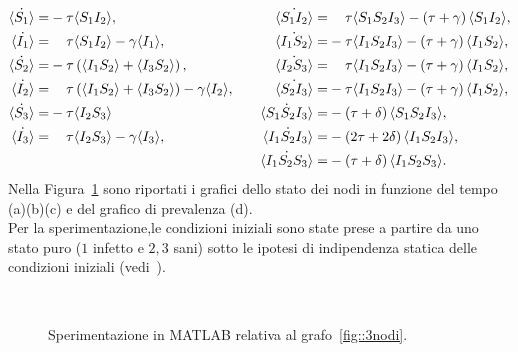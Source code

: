 \begin{equation}
\label{3nodi}
\begin{aligned}
	\dot{\angol {S_1}} =& -\tau \angol{ S_1 I_2},
& \quad 
	\dot{\angol{S_1I_2}}=& \spa\tau\angol{S_1S_2I_3} - \tonde{ \tau + \gamma}\angol{S_1 I_2},
\\ 
	\dot{\angol {I_1}} =&\spa \tau \angol{ S_1 I_2}-\gamma \angol{I_1}, 
& \quad 
	\dot{\angol{I_1S_2}}=&-\tau\angol{I_1S_2I_3} - \tonde{ \tau + \gamma}\angol{I_1 S_2},
\\ 
	\dot{\angol {S_2}} = & -\tau \tonde{ \angol{ I_1 S_2}+ \angol{I_3S_2}},
& \quad 
	\dot{\angol{I_2S_3}}=&\spa\tau\angol{I_1S_2I_3} - \tonde{ \tau + \gamma}\angol{I_1 S_2},
\\
	\dot{\angol {I_2}} = &\spa \tau \tonde{ \angol{ I_1 S_2} + \angol{I_3S_2}}-\gamma \angol{I_2}, 
& \quad 
	\dot{\angol{S_2I_3}}=&-\tau\angol{I_1S_2I_3} - \tonde{ \tau + \gamma}\angol{I_1 S_2},
\\ 
	\dot{\angol {S_3}} = & -\tau \angol{ I_2 S_3}
&\quad  
	\dot{\angol{S_1S_2I_3}}=&-\tonde{\tau + \delta}\angol{S_1S_2I_3},
\\
	\dot{\angol {I_3}} = & \spa \tau  \angol{ I_2 S_3}-\gamma \angol{I_3},	
& \quad 
	\dot{\angol{I_1S_2I_3}}=&-\tonde{2\tau + 2\delta}\angol{I_1S_2I_3},
\\
	&
&\quad  
	\dot{\angol{I_1S_2S_3}}=&-\tonde{\tau + \delta}\angol{I_1S_2S_3}.
 \end{aligned}
\end{equation}
Nella Figura~\ref{fig::spe3nodi} sono riportati i grafici dello stato dei nodi in funzione del tempo (a)(b)(c) e del grafico di prevalenza (d).\\
Per la sperimentazione,le condizioni iniziali sono state prese a partire da uno stato puro ($1$ infetto e $2,3$ sani) sotto le ipotesi di indipendenza statica delle condizioni iniziali (vedi~\cite{MR3340258}).
\begin{figure}[h]

\centering
\subfloat[][Nodo 1]
{\resizebox{0.45\textwidth}{!}{}}
 \quad 
\subfloat[][Nodo 2]
{\resizebox{0.45\textwidth}{!}{ }}
\\
\subfloat[][Nodo 3]
{\resizebox{0.45\textwidth}{!}
{}
}
\quad
\subfloat[][Preferenza]
{\resizebox{0.45\textwidth}{!}
{}
}
\caption{Sperimentazione in MATLAB relativa al  grafo~\ref{fig::3nodi}.}
\label{fig::spe3nodi}
\end{figure}


